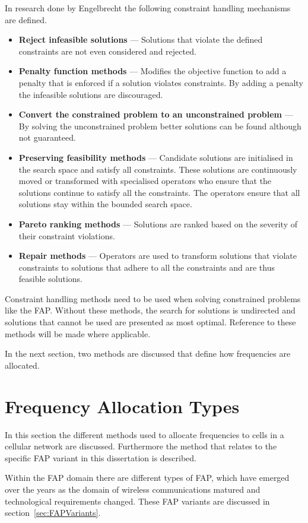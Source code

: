 In research done by Engelbrecht\cite{CompuIntelligenceIntro} the following constraint handling mechanisms are defined.
\begin{itemize}
\item{\textbf{Reject infeasible solutions}} --- Solutions that violate the defined constraints are not even considered and rejected.
\item{\textbf{Penalty function methods}} --- Modifies the objective function to add a penalty that is enforced if a solution violates constraints. By adding a penalty the infeasible solutions are discouraged.
\item{\textbf{Convert the constrained problem to an unconstrained problem}} --- By solving the unconstrained problem better solutions can be found although not guaranteed.
\item{\textbf{Preserving feasibility methods}} --- Candidate solutions are initialised in the search space and satisfy all constraints. These solutions are continuously moved or transformed with specialised operators who ensure that the solutions continue to satisfy all the constraints. The operators ensure that all solutions stay within the bounded search space.
\item{\textbf{Pareto ranking methods}} --- Solutions are ranked based on the severity of their constraint violations.
\item{\textbf{Repair methods}} --- Operators are used to transform solutions that violate constraints to solutions that adhere to all the constraints and are thus feasible solutions.
\end{itemize}

Constraint handling methods need to be used when solving constrained problems like the \gls{FAP}. Without these methods, the search for solutions is undirected and solutions that cannot be used are presented as most optimal. Reference to these methods will be made where applicable.

In the next section, two methods are discussed that define how frequencies are allocated.
\section{Frequency Allocation Types}
\label{sec:FreqAssignmentTypes}
In this section the different methods used to allocate frequencies to cells in a cellular network are discussed. Furthermore the method that relates to the specific \gls{FAP} variant in this dissertation is described.

Within the \gls{FAP} domain there are different types of \gls{FAP}, which have emerged over the years as the domain of wireless communications matured and technological requirements changed. These \gls{FAP} variants are discussed in section~\ref{sec:FAPVariants}.

